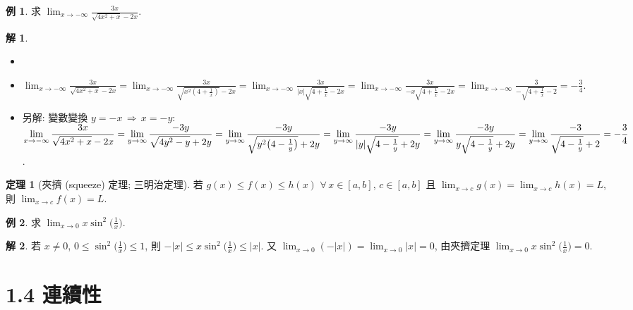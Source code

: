 \documentclass[12pt]{extarticle}
\newcommand{\ds}{\displaystyle}
\newcommand{\ie}{\,\Longrightarrow\,}
\theoremstyle{definition}
\newtheorem*{thm}{定理}
\newtheorem*{ex}{例}
\newtheorem*{sol}{解}
\begin{document}
\begin{ex}
  求 $\ds\lim_{x\to-\infty}\frac{3x}{\sqrt{4x^2 + x} - 2x}$. 
\end{ex}

\begin{sol}
  \begin{itemize}\setlength\itemsep{0em}
    \item[]
    \item $\ds\lim_{x\to-\infty}\frac{3x}{\sqrt{4x^2 + x} - 2x} = \lim_{x\to-\infty}\frac{3x}{\sqrt{x^2(4 + \frac{1}{x})} - 2x} = \lim_{x\to-\infty}\frac{3x}{|x|\sqrt{4 + \frac{1}{x}} - 2x} = \lim_{x\to-\infty}\frac{3x}{-x\sqrt{4 + \frac{1}{x}} - 2x} = \lim_{x\to-\infty}\frac{3}{-\sqrt{4 + \frac{1}{x}} - 2} = -\frac{3}{4}$. 
    \item 另解: 變數變換 $y = -x\ie x=-y$: $\ds\lim_{x\to-\infty}\frac{3x}{\sqrt{4x^2 + x} - 2x} = \lim_{y\to\infty}\frac{-3y}{\sqrt{4y^2 - y} + 2y} \\= \lim_{y\to\infty}\frac{-3y}{\sqrt{y^2\big(4 - \frac{1}{y}\big)} + 2y} = \lim_{y\to\infty}\frac{-3y}{|y|\sqrt{4 - \frac{1}{y}} + 2y} = \lim_{y\to\infty}\frac{-3y}{y\sqrt{4 - \frac{1}{y}} + 2y} =\lim_{y\to\infty}\frac{-3}{\sqrt{4 - \frac{1}{y}} + 2} = -\frac{3}{4}$. 
  \end{itemize}
\end{sol}

\begin{thm}[夾擠 (squeeze) 定理; 三明治定理]
  若 $g(x)\leqslant f(x)\leqslant h(x)$ $\forall\,x\in[a, b]$, $c\in[a, b]$ 且 $\ds\lim_{x\to c}g(x) = \lim_{x\to c}h(x) = L$, 則 $\ds\lim_{x\to c} f(x) = L$. 
\end{thm}

\begin{ex}
  求 $\ds\lim_{x\to 0}x\sin^2\Big(\frac{1}{x}\Big)$. 
\end{ex}

\begin{sol}
  若 $x\ne 0$, $\ds 0\leqslant\sin^2\Big(\frac{1}{x}\Big)\leqslant 1$, 則 $\ds-|x|\leqslant x\sin^2\Big(\frac{1}{x}\Big)\leqslant|x|$. 又 $\ds\lim_{x\to 0}(-|x|) = \lim_{x\to 0}|x| = 0$, 由夾擠定理 $\ds\lim_{x\to 0}x\sin^2\Big(\frac{1}{x}\Big) = 0$. 
\end{sol}

\section*{1.4 連續性}
\end{document}
